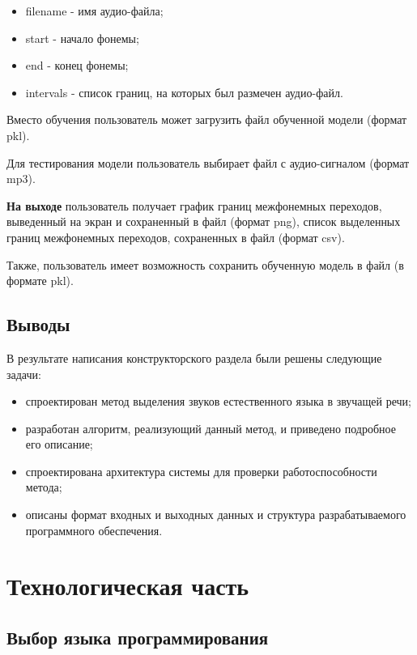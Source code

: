 \documentclass[utf8x, 14pt, oneside, a4paper]{article}
\begin{document}
	\begin{itemize}
		\item filename - имя аудио-файла;
		\item start - начало фонемы;
		\item end - конец фонемы;
		\item intervals - список границ, на которых был размечен аудио-файл.
	\end{itemize}

	Вместо обучения пользователь может загрузить файл обученной модели (формат pkl).
	
	Для тестирования модели пользователь выбирает файл с аудио-сигналом (формат mp3).
	
	{\bf На выходе} пользователь получает график границ межфонемных переходов, выведенный на экран и сохраненный в файл (формат png), список выделенных границ межфонемных переходов, сохраненных в файл (формат csv).
	
	Также, пользователь имеет возможность сохранить обученную модель в файл (в формате pkl).
	
	\subsection{Выводы}
	
	В результате написания конструкторского раздела были решены следующие задачи:
	\begin{itemize}
		\item спроектирован метод выделения звуков естественного языка в звучащей речи;
		\item разработан алгоритм, реализующий данный метод, и приведено подробное его описание;
		\item спроектирована архитектура системы для проверки работоспособности метода;
		\item описаны формат входных и выходных данных и структура разрабатываемого программного обеспечения.
	\end{itemize}
		
	\pagebreak
	
	\section{Технологическая часть}
	
	\subsection{Выбор языка программирования}
	
\end{document}
